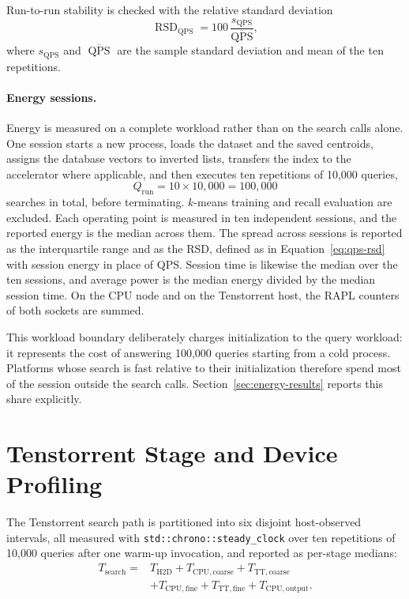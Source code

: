 Run-to-run stability is checked with the relative standard deviation
\begin{equation}
\operatorname{RSD}_{\mathrm{QPS}}
=100\,\frac{s_{\mathrm{QPS}}}{\overline{\operatorname{QPS}}},
\label{eq:qps-rsd}
\end{equation}
where \(s_{\mathrm{QPS}}\) and \(\overline{\operatorname{QPS}}\) are the sample
standard deviation and mean of the ten repetitions.

\paragraph{Energy sessions.}
Energy is measured on a complete workload rather than on the search calls
alone. One session starts a new process, loads the dataset and the saved
centroids, assigns the database vectors to inverted lists, transfers the index
to the accelerator where applicable, and then executes ten repetitions of
10,000 queries,
\begin{equation}
Q_{\mathrm{run}}=10\times10{,}000=100{,}000
\label{eq:queries-per-run}
\end{equation}
searches in total, before terminating. \(k\)-means training and recall
evaluation are excluded. Each operating point is measured in ten independent
sessions, and the reported energy is the median across them. The
spread across sessions is reported as the interquartile range and as the RSD,
defined as in Equation~\ref{eq:qps-rsd} with session energy in place of QPS.
Session time is likewise the median over the ten sessions, and average power
is the median energy divided by the median session time. On the CPU node and
on the Tenstorrent host, the RAPL counters of both sockets are summed.

This workload boundary deliberately charges initialization to the query
workload: it represents the cost of answering 100,000 queries starting from a
cold process. Platforms whose search is fast relative to their initialization
therefore spend most of the session outside the search calls.
Section~\ref{sec:energy-results} reports this share explicitly.

\section{Tenstorrent Stage and Device Profiling}
\label{sec:tt-stage-method}

The Tenstorrent search path is partitioned into six disjoint host-observed
intervals, all measured with \texttt{std::chrono::steady\_clock} over ten
repetitions of 10,000 queries after one warm-up invocation, and reported as
per-stage medians:
\begin{equation}
\begin{aligned}
T_{\mathrm{search}}={}&T_{\mathrm{H2D}}
+T_{\mathrm{CPU,coarse}}
+T_{\mathrm{TT,coarse}}\\
&+T_{\mathrm{CPU,fine}}
+T_{\mathrm{TT,fine}}
+T_{\mathrm{CPU,output}}.
\end{aligned}
\label{eq:tt-stage-sum-method}
\end{equation}

